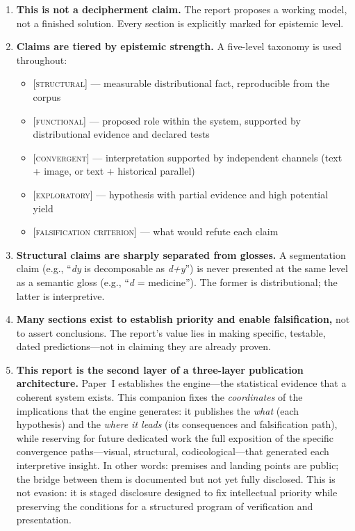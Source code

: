 \documentclass[11pt,a4paper]{article}
\newcommand{\structural}{\textsc{[structural]}}
\newcommand{\functional}{\textsc{[functional]}}
\newcommand{\convergent}{\textsc{[convergent]}}
\newcommand{\exploratory}{\textsc{[exploratory]}}
\begin{document}
\begin{enumerate}[leftmargin=2em]
\item \textbf{This is not a decipherment claim.} The report proposes a working model, not a finished solution. Every section is explicitly marked for epistemic level.

\item \textbf{Claims are tiered by epistemic strength.} A five-level taxonomy is used throughout:
\begin{itemize}[leftmargin=1.5em]
\item \structural{} --- measurable distributional fact, reproducible from the corpus
\item \functional{} --- proposed role within the system, supported by distributional evidence and declared tests
\item \convergent{} --- interpretation supported by independent channels (text + image, or text + historical parallel)
\item \exploratory{} --- hypothesis with partial evidence and high potential yield
\item \textsc{[falsification criterion]} --- what would refute each claim
\end{itemize}

\item \textbf{Structural claims are sharply separated from glosses.} A segmentation claim (e.g., ``\textit{dy} is decomposable as \textit{d+y}'') is never presented at the same level as a semantic gloss (e.g., ``\textit{d} = medicine''). The former is distributional; the latter is interpretive.

\item \textbf{Many sections exist to establish priority and enable falsification,} not to assert conclusions. The report's value lies in making specific, testable, dated predictions---not in claiming they are already proven.

\item \textbf{This report is the second layer of a three-layer publication architecture.} Paper~I establishes the engine---the statistical evidence that a coherent system exists. This companion fixes the \textit{coordinates} of the implications that the engine generates: it publishes the \textit{what} (each hypothesis) and the \textit{where it leads} (its consequences and falsification path), while reserving for future dedicated work the full exposition of the specific convergence paths---visual, structural, codicological---that generated each interpretive insight. In other words: premises and landing points are public; the bridge between them is documented but not yet fully disclosed. This is not evasion: it is staged disclosure designed to fix intellectual priority while preserving the conditions for a structured program of verification and presentation.
\end{enumerate}
\end{document}
